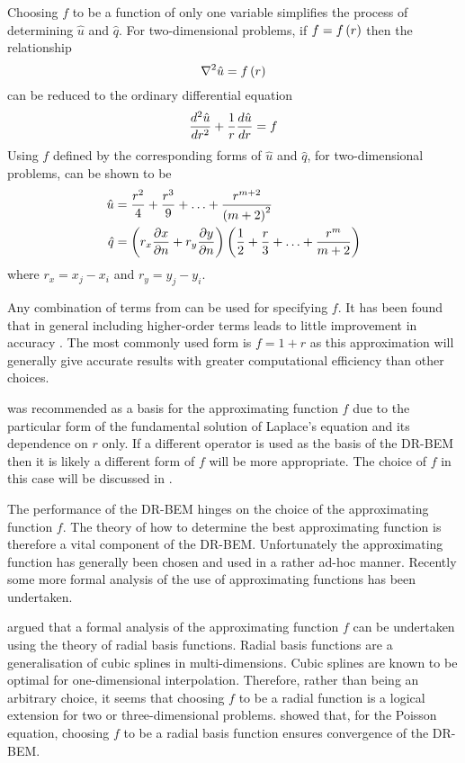 Choosing $f$ to be a function of only one variable simplifies the process
of determining $\hat{u}$ and $\hat{q}$.  For two-dimensional problems, if $f
=  f\left( r \right) $ then the relationship
\begin{equation}
  \laplacian{}{\hat{u}} = \fnof{f}{r} 
\end{equation}
can be reduced to the ordinary differential equation
\begin{equation}
   \dfrac{ d^{2} \hat{u}}{d {r}^{2}}  + \dfrac{1}{r}  \dfrac{ d \hat{u}}{d r}  = f 
\end{equation}
Using $f$ defined by  the corresponding forms of $\hat{u}$
and $\hat{q}$, for two-dimensional problems, can be shown to be
\begin{align}
  \hat{u} & = \dfrac{r^{2}}{4} + \dfrac{r^{3}}{9} + \ldots +
  \dfrac{r^{m+2}}{\left( m+2 \right)^{2}} \\ \hat{q} & = \left( r_{x}  \dfrac{\partial x}{\partial n}  +
    r_{y}  \dfrac{\partial y}{\partial n}  \right) \left( \dfrac{1}{2} + \dfrac{r}{3} +\ldots+
    \dfrac{r^{m}}{m+2} \right)
\end{align}
where $r_{x} = x_{j} - x_{i}$ and $r_{y} = y_{j} - y_{i}$.

Any combination of terms from  can be used for specifying
$f$. It has been found that in general including higher-order terms leads
to little improvement in accuracy \cite{partridge:1992}. The most commonly
used form is $f = 1 + r$ as this approximation will generally give accurate
results with greater computational efficiency than other choices.

 was recommended as a basis for the approximating function
$f$ due to the particular form of the fundamental solution of Laplace's
equation and its dependence on $r$ only. If a different operator is used as
the basis of the DR-BEM then it is likely a different form of $f$ will be
more appropriate.  The choice of $f$ in this case will be discussed in
.

The performance of the DR-BEM hinges on the choice of the approximating
function $f$.  The theory of how to determine the best approximating
function is therefore a vital component of the DR-BEM.  Unfortunately the
approximating function has generally been chosen and used in a rather
ad-hoc manner.  Recently some more formal analysis of the use of
approximating functions has been undertaken. 

 argued that a formal analysis of the approximating
function $f$ can be undertaken using the theory of radial basis functions.
Radial basis functions are a generalisation of cubic splines in
multi-dimensions.  Cubic splines are known to be optimal for one-dimensional
interpolation.  Therefore, rather than being an arbitrary choice, it seems
that choosing $f$ to be a radial function is a logical extension for two
or three-dimensional problems.   showed that, for the
Poisson equation, choosing $f$ to be a radial basis function ensures
convergence of the DR-BEM.

